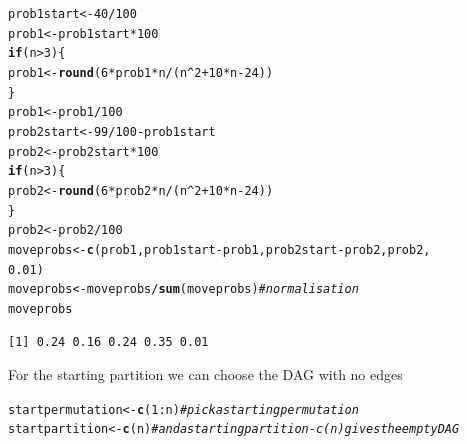\documentclass[a4paper]{article}\usepackage[]{graphicx}\usepackage[]{color}
\makeatletter
\newcommand{\hlnum}[1]{\textcolor[rgb]{0.686,0.059,0.569}{#1}}%
\newcommand{\hlcom}[1]{\textcolor[rgb]{0.678,0.584,0.686}{\textit{#1}}}%
\newcommand{\hlopt}[1]{\textcolor[rgb]{0,0,0}{#1}}%
\newcommand{\hlstd}[1]{\textcolor[rgb]{0.345,0.345,0.345}{#1}}%
\newcommand{\hlkwa}[1]{\textcolor[rgb]{0.161,0.373,0.58}{\textbf{#1}}}%
\newcommand{\hlkwb}[1]{\textcolor[rgb]{0.69,0.353,0.396}{#1}}%
\newcommand{\hlkwd}[1]{\textcolor[rgb]{0.737,0.353,0.396}{\textbf{#1}}}%
\newenvironment{kframe}{%
 \def\at@end@of@kframe{}%
 \ifinner\ifhmode%
  \def\at@end@of@kframe{\end{minipage}}%
  \begin{minipage}{\columnwidth}%
 \fi\fi%
 \def\FrameCommand##1{\hskip\@totalleftmargin \hskip-\fboxsep
 \colorbox{shadecolor}{##1}\hskip-\fboxsep
     \hskip-\linewidth \hskip-\@totalleftmargin \hskip\columnwidth}%
 \MakeFramed {\advance\hsize-\width
   \@totalleftmargin\z@ \linewidth\hsize
   \@setminipage}}%
 {\par\unskip\endMakeFramed%
 \at@end@of@kframe}
\newenvironment{knitrout}{}{} %
\newcommand{\nn}{\noindent}
\makeatother
\begin{document}
\begin{knitrout}
\color{fgcolor}\begin{kframe}
\begin{alltt}
\hlstd{prob1start} \hlkwb{<-} \hlnum{40}\hlopt{/}\hlnum{100}
\hlstd{prob1} \hlkwb{<-} \hlstd{prob1start} \hlopt{*} \hlnum{100}
\hlkwa{if} \hlstd{(n} \hlopt{>} \hlnum{3}\hlstd{) \{}
    \hlstd{prob1} \hlkwb{<-} \hlkwd{round}\hlstd{(}\hlnum{6} \hlopt{*} \hlstd{prob1} \hlopt{*} \hlstd{n}\hlopt{/}\hlstd{(n}\hlopt{^}\hlnum{2} \hlopt{+} \hlnum{10} \hlopt{*} \hlstd{n} \hlopt{-} \hlnum{24}\hlstd{))}
\hlstd{\}}
\hlstd{prob1} \hlkwb{<-} \hlstd{prob1}\hlopt{/}\hlnum{100}
\hlstd{prob2start} \hlkwb{<-} \hlnum{99}\hlopt{/}\hlnum{100} \hlopt{-} \hlstd{prob1start}
\hlstd{prob2} \hlkwb{<-} \hlstd{prob2start} \hlopt{*} \hlnum{100}
\hlkwa{if} \hlstd{(n} \hlopt{>} \hlnum{3}\hlstd{) \{}
    \hlstd{prob2} \hlkwb{<-} \hlkwd{round}\hlstd{(}\hlnum{6} \hlopt{*} \hlstd{prob2} \hlopt{*} \hlstd{n}\hlopt{/}\hlstd{(n}\hlopt{^}\hlnum{2} \hlopt{+} \hlnum{10} \hlopt{*} \hlstd{n} \hlopt{-} \hlnum{24}\hlstd{))}
\hlstd{\}}
\hlstd{prob2} \hlkwb{<-} \hlstd{prob2}\hlopt{/}\hlnum{100}
\hlstd{moveprobs} \hlkwb{<-} \hlkwd{c}\hlstd{(prob1, prob1start} \hlopt{-} \hlstd{prob1, prob2start} \hlopt{-} \hlstd{prob2, prob2,}
    \hlnum{0.01}\hlstd{)}
\hlstd{moveprobs} \hlkwb{<-} \hlstd{moveprobs}\hlopt{/}\hlkwd{sum}\hlstd{(moveprobs)}  \hlcom{# normalisation}
\hlstd{moveprobs}
\end{alltt}
\begin{verbatim}
[1] 0.24 0.16 0.24 0.35 0.01
\end{verbatim}
\end{kframe}
\end{knitrout}

\nn For the starting partition we can choose the DAG with no edges

\begin{knitrout}
\color{fgcolor}\begin{kframe}
\begin{alltt}
\hlstd{startpermutation} \hlkwb{<-} \hlkwd{c}\hlstd{(}\hlnum{1}\hlopt{:}\hlstd{n)}  \hlcom{# pick a starting permutation}
\hlstd{startpartition} \hlkwb{<-} \hlkwd{c}\hlstd{(n)}  \hlcom{# and a starting partition - c(n) gives the empty DAG}
\end{alltt}
\end{kframe}
\end{knitrout}
\end{document}
